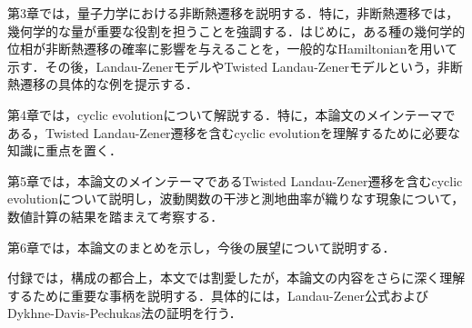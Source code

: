 第3章では，量子力学における非断熱遷移を説明する．特に，非断熱遷移では，幾何学的な量が重要な役割を担うことを強調する．はじめに，ある種の幾何学的位相が非断熱遷移の確率に影響を与えることを，一般的なHamiltonianを用いて示す．その後，Landau-ZenerモデルやTwisted Landau-Zenerモデルという，非断熱遷移の具体的な例を提示する．


第4章では，cyclic evolutionについて解説する．特に，本論文のメインテーマである，Twisted Landau-Zener遷移を含むcyclic evolutionを理解するために必要な知識に重点を置く．


第5章では，本論文のメインテーマであるTwisted Landau-Zener遷移を含むcyclic evolutionについて説明し，波動関数の干渉と測地曲率が織りなす現象について，数値計算の結果を踏まえて考察する．


第6章では，本論文のまとめを示し，今後の展望について説明する．


付録では，構成の都合上，本文では割愛したが，本論文の内容をさらに深く理解するために重要な事柄を説明する．具体的には，Landau-Zener公式\cite{Zener}およびDykhne-Davis-Pechukas法\cite{Dykhne}\cite{DavisPechukas1976}\cite{Hwang}の証明を行う．
